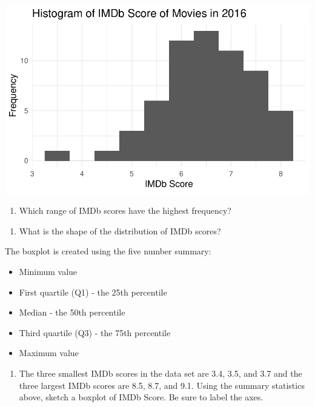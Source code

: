 \documentclass[
]{report}
\providecommand{\tightlist}{%
  \setlength{\itemsep}{0pt}\setlength{\parskip}{0pt}}
\begin{document}
\begin{center}\includegraphics[width=0.6\linewidth]{04-EDA-quantitative_files/figure-latex/unnamed-chunk-3-1} \end{center}

\begin{enumerate}
\def\labelenumi{\arabic{enumi}.}
\setcounter{enumi}{7}
\tightlist
\item
  Which range of IMDb scores have the highest frequency?
\end{enumerate}

\vspace{0.5in}

\begin{enumerate}
\def\labelenumi{\arabic{enumi}.}
\setcounter{enumi}{8}
\tightlist
\item
  What is the shape of the distribution of IMDb scores?
\end{enumerate}

\vspace{0.5in}

The boxplot is created using the five number summary:

\begin{itemize}
\item
  Minimum value
\item
  First quartile (Q1) - the 25th percentile
\item
  Median - the 50th percentile
\item
  Third quartile (Q3) - the 75th percentile
\item
  Maximum value
\end{itemize}

\begin{enumerate}
\def\labelenumi{\arabic{enumi}.}
\setcounter{enumi}{9}
\tightlist
\item
  The three smallest IMDb scores in the data set are 3.4, 3.5, and 3.7 and the three largest IMDb scores are 8.5, 8.7, and 9.1. Using the summary statistics above, sketch a boxplot of IMDb Score. Be sure to label the axes.
\end{enumerate}
\end{document}
